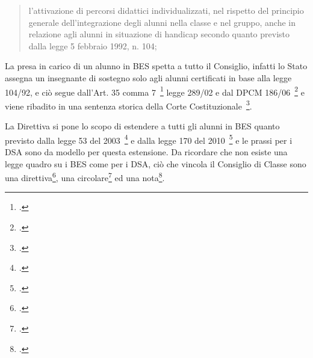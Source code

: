 \begin{quote}
\begin{description}
\begin{description}
		\begin{description}
			\item 	\mancatesto
			\item[c] l'attivazione di percorsi didattici individualizzati, nel rispetto del principio generale dell'integrazione degli alunni nella classe e nel gruppo, anche in relazione agli alunni in situazione di handicap secondo quanto previsto dalla legge 5 febbraio 1992, n. 104;
		\end{description} 
	\end{description}
\end{description}
\end{quote}
La presa in carico di un alunno in BES spetta a tutto il Consiglio, infatti lo Stato assegna un insegnante di sostegno solo agli alunni certificati in base alla legge 104/92, e ciò segue dall'Art. 35 comma 7~\footcite{Legge27dic00n289} legge 289/02 e dal DPCM 186/06~\footcite{DPCM22_02_06_N_185} e viene ribadito in una sentenza storica della Corte Costituzionale~\footcite{SCC_80_2010}. 

La Direttiva si pone lo scopo di estendere a tutti gli alunni in BES quanto previsto dalla legge 53 del 2003~\footcite{Legge_53_2003} e dalla legge 170 del 2010~\footcite{legge170} e le prassi per i DSA sono da modello per questa estensione. Da ricordare che non esiste una legge quadro su i BES come per i DSA, ciò che vincola il Consiglio di Classe sono una direttiva\footcite{dir27Dic2012}, una circolare\footcite{cm8_2013} ed una nota\footcite{Nota_1551_2013}. 

